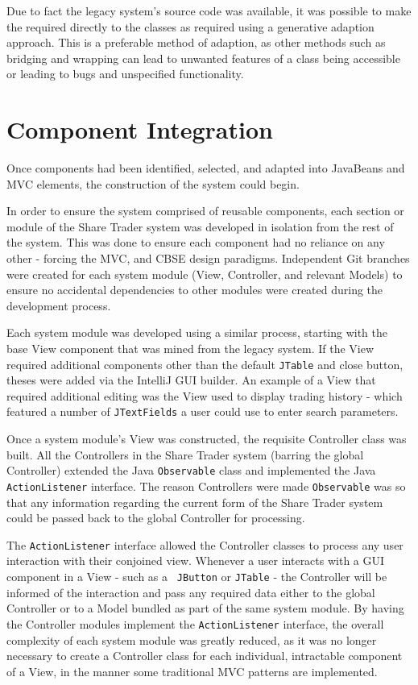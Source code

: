 \documentclass[12pt, a4paper,titlepage]{article}
\begin{document}
Due to fact the legacy system’s source code was available, it was possible to
make the required  directly to the classes as required using a generative
adaption approach. 
This is a preferable method of adaption, as other methods such as bridging and
wrapping can lead to unwanted features of a class being accessible or leading
to bugs and unspecified functionality.


\section{Component Integration}
Once components had been identified, selected, and adapted into JavaBeans and
MVC elements, the construction of the system could begin.
 
In order to ensure the system comprised of reusable components, each section
or module of the Share Trader system was developed in isolation from the rest
of the system. 
This was done to ensure  each component had no reliance on any other - forcing
the MVC, and CBSE  design paradigms.  
Independent Git branches were created for each system module (View,
Controller, and relevant Models) to ensure no accidental dependencies to other
modules were created during the development process.

Each system module was developed using a similar process, starting with the
base View component that was mined from the legacy system. 
If the View required additional components other than the default {\tt JTable}
and close button, theses were added via the IntelliJ GUI builder. 
An example of a View that required additional editing was the View used to
display trading history - which featured a number of {\tt JTextFields} a user
could use to enter search parameters.

Once a system module’s View was constructed, the requisite Controller class
was built. 
All the Controllers in the Share Trader system (barring the global Controller)
extended the Java {\tt Observable} class and implemented the Java
{\tt ActionListener} interface. 
The reason Controllers were made {\tt Observable} was so that any information
regarding the current form of the Share Trader system could be passed back to
the global Controller for processing.  

The {\tt ActionListener} interface allowed the Controller classes to process any
user interaction with their conjoined view. 
Whenever a user interacts with a GUI component in a View - such as a {\tt
JButton} or {\tt JTable} - the Controller will be informed of the interaction
and pass any required data either to the global Controller or to a Model
bundled as part of the same system module.
By having the Controller modules implement the {\tt ActionListener} interface,
the overall complexity of each system module was greatly reduced, as it was no
longer necessary to create a Controller class for each individual, intractable
component of a View, in the manner some traditional MVC patterns are
implemented.
\end{document}
